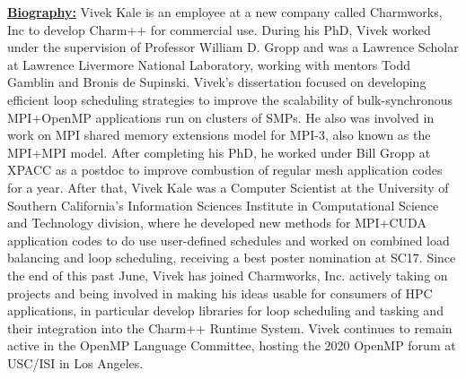 \documentclass{article}
\title{}
\author{}
\date{}
\begin{document}
\underline{\bf Biography:} Vivek Kale is an employee at a new company called Charmworks, Inc to develop Charm++ for commercial use. During his PhD, Vivek worked under the supervision of Professor William D. Gropp and was a Lawrence Scholar at Lawrence Livermore National Laboratory, working with mentors Todd Gamblin and Bronis de Supinski. Vivek's dissertation focused on developing efficient
loop scheduling strategies to improve the scalability of
bulk-synchronous MPI+OpenMP applications run on clusters of SMPs. He
also was involved in work on MPI shared memory extensions model for
MPI-3, also known as the MPI+MPI model. After completing his PhD, he
worked under Bill Gropp at XPACC as a postdoc to improve
combustion of regular mesh application codes for a year. 
After that, Vivek Kale was a Computer Scientist at the University
of Southern California's Information Sciences Institute in
Computational Science and Technology division, where he developed new
methods for MPI+CUDA application codes to do use user-defined
schedules and worked on combined load balancing and loop scheduling,
receiving a best poster nomination at SC17. Since the end of this past
June, Vivek has joined Charmworks, Inc. actively taking on projects
and being involved in making his ideas usable for consumers of HPC
applications, in particular develop libraries for loop scheduling and
tasking and their integration into the Charm++ Runtime System. Vivek continues to remain active in the OpenMP Language Committee, hosting the 2020 OpenMP forum at USC/ISI in Los Angeles.

 


% 
\end{document}

